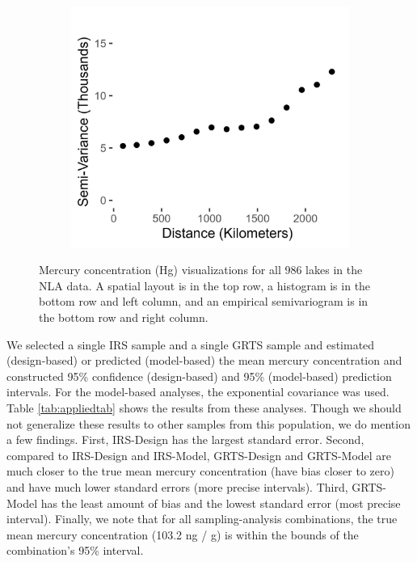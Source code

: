 \documentclass[]{elsarticle} %
\begin{document}
\begin{figure}
\begin{subfigure}{0.49\textwidth}
  \caption*{}
  \label{fig:mercury_hist}
\end{subfigure}
\begin{subfigure}{0.49\textwidth}
  \centering
  \includegraphics[width = 1\linewidth]{figures/sv_plot.jpeg}
  \caption*{}
  \label{fig:sv_plot}
\end{subfigure}
\caption{Mercury concentration (Hg) visualizations for all 986 lakes in the NLA data. A spatial layout is in the top row, a histogram is in the bottom row and left column, and an empirical semivariogram is in the bottom row and right column.}
\label{fig:merc}
\end{figure}

We selected a single IRS sample and a single GRTS sample and estimated
(design-based) or predicted (model-based) the mean mercury concentration
and constructed 95\% confidence (design-based) and 95\% (model-based)
prediction intervals. For the model-based analyses, the exponential
covariance was used. Table \ref{tab:appliedtab} shows the results from
these analyses. Though we should not generalize these results to other
samples from this population, we do mention a few findings. First,
IRS-Design has the largest standard error. Second, compared to
IRS-Design and IRS-Model, GRTS-Design and GRTS-Model are much closer to
the true mean mercury concentration (have bias closer to zero) and have
much lower standard errors (more precise intervals). Third, GRTS-Model
has the least amount of bias and the lowest standard error (most precise
interval). Finally, we note that for all sampling-analysis combinations,
the true mean mercury concentration (103.2 ng / g) is within the bounds
of the combination's 95\% interval.
\end{document}
